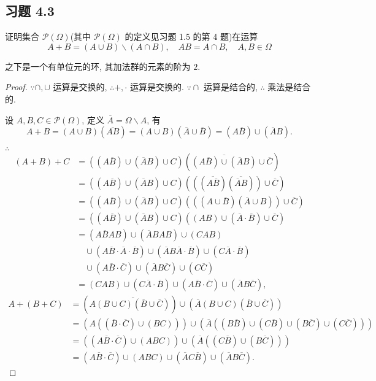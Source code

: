 \documentclass[color=black,device=normal,lang=cn,mode=geye]{elegantnote}
\begin{document}
\subsection{习题 4.3}
\begin{exercise}%
    证明集合 $\mathcal{P}(\Omega)$(其中 $\mathcal{P}(\Omega)$ 的定义见习题 1.5 的第 4 题)在运算
    \[A+B=(A\cup B)\backslash(A\cap B),\quad AB=A\cap B,\quad A,B\in\Omega\]

    之下是一个有单位元的环, 其加法群的元素的阶为 $2$.
\end{exercise}
\begin{proof}
    $\because\cap,\cup$ 运算是交换的, $\therefore+,\cdot$ 运算是交换的. $\because\cap$ 运算是结合的, $\therefore$ 乘法是结合的.
    
    设 $A,B,C\in\mathcal{P}(\Omega)$, 定义 $\overline{A}=\Omega\backslash A$, 有
    \[A+B=(A\cup B)(\overline{AB})=(A\cup B)(\overline{A}\cup\overline{B})=(A\overline{B})\cup(\overline{A}B).\]

    $\therefore$
    \begin{align*}
        (A+B)+C & =((A\overline{B})\cup(\overline{A} B)\cup C)(\overline{(A\overline{B})\cup(\overline{A} B)}\cup\overline{C}) \\
        & =((A\overline{B})\cup(\overline{A}B)\cup C)(((\overline{A\overline{B}})(\overline{\overline{A}B}))\cup\overline{C}) \\
        & =((A\overline{B})\cup(\overline{A}B)\cup C)(((A\cup\overline{B})(\overline{A}\cup B))\cup\overline{C}) \\
        & =((A\overline{B})\cup(\overline{A}B)\cup C)((AB)\cup(\overline{A}\cdot\overline{B})\cup\overline{C}) \\
        & =(A\overline{B}AB)\cup(\overline{A}BAB)\cup(CAB) \\
        & \quad\cup(A\overline{B}\cdot\overline{A}\cdot\overline{B})\cup(\overline{A}B\overline{A}\cdot\overline{B})\cup(C\overline{A}\cdot\overline{B}) \\
        & \quad\cup(A\overline{B}\cdot\overline{C})\cup(\overline{A}B\overline{C})\cup(C\overline{C}) \\
        & =(CAB)\cup(C\overline{A}\cdot\overline{B})\cup(A\overline{B}\cdot\overline{C})\cup(\overline{A}B\overline{C}),
    \end{align*}
    \begin{align*}
        A+(B+C) & =(A\overline{(B\cup C)(\overline{B}\cup\overline{C})})\cup(\overline{A}(B\cup C)(\overline{B}\cup\overline{C})) \\
        & =(A((\overline{B}\cdot\overline{C})\cup(BC)))\cup(\overline{A}((B\overline{B})\cup(C\overline{B})\cup(B\overline{C})\cup(C\overline{C}))) \\
        & =((A\overline{B}\cdot\overline{C})\cup(ABC))\cup(\overline{A}((C\overline{B})\cup(B\overline{C}))) \\
        & =(A\overline{B}\cdot\overline{C})\cup(ABC)\cup(\overline{A}C\overline{B})\cup(\overline{A}B\overline{C}).
    \end{align*}


\end{proof}
\end{document}
